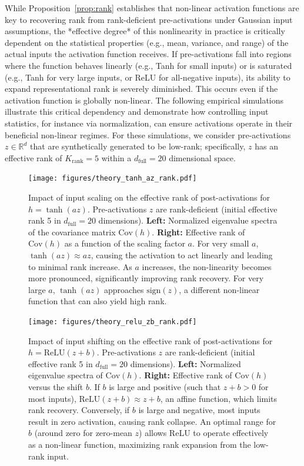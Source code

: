 \documentclass{article}
\newcommand{\R}{\mathbb{R}}
\begin{document}
While Proposition~\ref{prop:rank} establishes that non-linear activation functions are key to recovering rank from rank-deficient pre-activations under Gaussian input assumptions, the *effective degree* of this nonlinearity in practice is critically dependent on the statistical properties (e.g., mean, variance, and range) of the actual inputs the activation function receives. If pre-activations fall into regions where the function behaves linearly (e.g., Tanh for small inputs) or is saturated (e.g., Tanh for very large inputs, or ReLU for all-negative inputs), its ability to expand representational rank is severely diminished. This occurs even if the activation function is globally non-linear. The following empirical simulations illustrate this critical dependency and demonstrate how controlling input statistics, for instance via normalization, can ensure activations operate in their beneficial non-linear regimes. For these simulations, we consider pre-activations $z \in \R^{d}$ that are synthetically generated to be low-rank; specifically, $z$ has an effective rank of $K_{\text{rank}}=5$ within a $d_{\text{full}}=20$ dimensional space.

\begin{figure}[ht!]
    \centering
    \texttt{[image: figures/theory\_tanh\_az\_rank.pdf]}
    \caption{Impact of input scaling on the effective rank of post-activations for $h = \tanh(az)$. Pre-activations $z$ are rank-deficient (initial effective rank 5 in $d_{\text{full}}=20$ dimensions). \textbf{Left:} Normalized eigenvalue spectra of the covariance matrix $\mathrm{Cov}(h)$. \textbf{Right:} Effective rank of $\mathrm{Cov}(h)$ as a function of the scaling factor $a$. For very small $a$, $\tanh(az) \approx az$, causing the activation to act linearly and leading to minimal rank increase. As $a$ increases, the non-linearity becomes more pronounced, significantly improving rank recovery. For very large $a$, $\tanh(az)$ approaches $\mathrm{sign}(z)$, a different non-linear function that can also yield high rank.}
    \label{fig:theory_tanh_az_rank}
\end{figure}

\begin{figure}[ht!]
    \centering
    \texttt{[image: figures/theory\_relu\_zb\_rank.pdf]}
    \caption{Impact of input shifting on the effective rank of post-activations for $h = \mathrm{ReLU}(z+b)$. Pre-activations $z$ are rank-deficient (initial effective rank 5 in $d_{\text{full}}=20$ dimensions). \textbf{Left:} Normalized eigenvalue spectra of $\mathrm{Cov}(h)$. \textbf{Right:} Effective rank of $\mathrm{Cov}(h)$ versus the shift $b$. If $b$ is large and positive (such that $z+b > 0$ for most inputs), $\mathrm{ReLU}(z+b) \approx z+b$, an affine function, which limits rank recovery. Conversely, if $b$ is large and negative, most inputs result in zero activation, causing rank collapse. An optimal range for $b$ (around zero for zero-mean $z$) allows ReLU to operate effectively as a non-linear function, maximizing rank expansion from the low-rank input.}
    \label{fig:theory_relu_zb_rank}
\end{figure}
\end{document}
